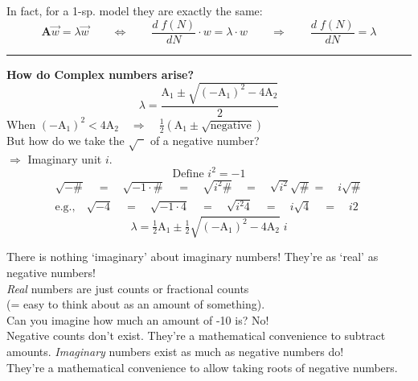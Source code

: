 \documentclass{article}
\newcommand{\ind}{\-\hspace{1cm}}
\begin{document}
In fact, for a 1-sp. model they are exactly the same:\\
\begin{equation*}
	\mathbf{A} \vec{w} = \lambda \vec{w} \qquad \Leftrightarrow \qquad \frac{d \; f(N)}{d N} \cdot  w  = \lambda \cdot w \qquad \Rightarrow \qquad \frac{d \; f(N)}{d N} = \lambda
\end{equation*}

\rule[0.5ex]{\linewidth}{1pt}

\textbf{How do Complex numbers arise?}\\
\begin{equation*}
	\lambda = \frac{\text{A}_1 \pm \sqrt{(-\text{A}_1)^2 - 4\text{A}_2}}{2}
\end{equation*}
When $(-\text{A}_1)^2 < 4 \text{A}_2  \quad \Rightarrow \quad \tfrac{1}{2}(\text{A}_1\pm \sqrt{\text{negative}})$\\
But how do we take the $\sqrt{\phantom{x}}$ of a negative number?\\
\ind $\Rightarrow$ Imaginary unit $i$.
\begin{equation*}
	\boxed{\text{Define }i^2 = -1}
\end{equation*}
\begin{align*}
	\sqrt{-\#} \quad = \quad \sqrt{-1 \cdot \#} \quad = \quad \sqrt{i^2\#} \quad = \quad \sqrt{i^2} \sqrt{\#} = \quad i \sqrt{\#}\\
	\text{e.g.,} \quad	\sqrt{-4} \quad = \quad \sqrt{-1 \cdot 4} \quad = \quad \sqrt{i^2 4} \quad = \quad i \sqrt{4} \quad = \quad i2
\end{align*}
\begin{equation*}
	\lambda = \tfrac{1}{2}\text{A}_1 \pm \tfrac{1}{2}\sqrt{(-\text{A}_1)^2 - 4\text{A}_2} \; i
\end{equation*}

There is nothing `imaginary' about imaginary numbers!  They're as `real' as negative numbers!\\
\ind \emph{Real} numbers are just counts or fractional counts \\
\ind \ind (= easy to think about as an amount of something).\\
\ind \ind Can you imagine how much an amount of -10 is?  No!\\
\ind \ind Negative counts don't exist.  They're a mathematical convenience to subtract amounts.
\ind \emph{Imaginary} numbers exist as much as negative numbers do! \\
\ind \ind They're a mathematical convenience to allow taking roots of negative numbers.\\
\end{document}
